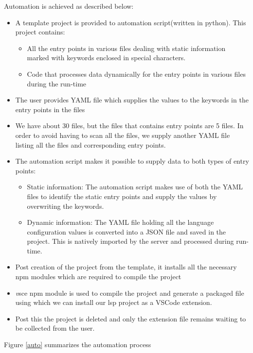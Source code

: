 \documentclass[dvipsnames]{article}
\begin{document}
Automation is achieved as described below:
\begin{itemize}
  \item A template project is provided to automation script(written in python). This project contains:
  \begin{itemize}
    \item All the entry points in various files dealing with static information marked with keywords enclosed in special characters.
    \item Code that processes data dynamically for the entry points in various files during the run-time
  \end{itemize}
  \item The user provides YAML file which supplies the values to the keywords in the entry points in the files
  \item We have about 30 files, but the files that contains entry points are 5 files. In order to avoid having to scan all the files, we supply another YAML file listing all the files and corresponding entry points.
  \item The automation script makes it possible to supply data to both types of entry points:
  \begin{itemize}
    \item Static information: The automation script makes use of both the YAML files to identify the static entry points and supply the values by overwriting the keywords.
    \item Dynamic information: The YAML file holding all the language configuration values is converted into a JSON file and saved in the project. This is natively imported by the server and processed during run-time.
  \end{itemize}
  \item Post creation of the project from the template, it installs all the necessary npm modules which are required to compile the project
  \item {\textit vsce} npm module is used to compile the project and generate a packaged file using which we can install our lsp project as a VSCode extension.
  \item Post this the project is deleted and only the extension file remains waiting to be collected from the user.
\end{itemize}

Figure \ref{auto} summarizes the automation process
\end{document}
